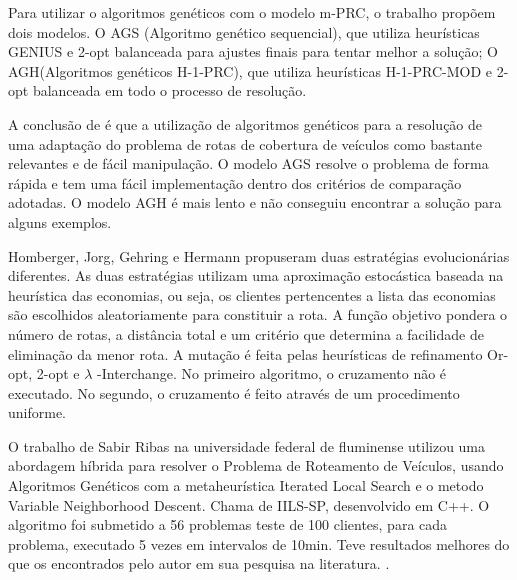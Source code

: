 \begin{minipage}{\linewidth}
    \label{fig:GrafoVUW}
\end{minipage}

Para utilizar o algoritmos genéticos com o modelo m-PRC, o trabalho propõem dois modelos. O AGS (Algoritmo genético sequencial), que utiliza heurísticas GENIUS e 2-opt balanceada para ajustes finais para tentar melhor a solução; O AGH(Algoritmos genéticos H-1-PRC), que utiliza heurísticas H-1-PRC-MOD e 2-opt balanceada em todo o processo de resolução.

A conclusão de \cite{Washington} é que a utilização de algoritmos genéticos para a resolução de uma adaptação do problema de rotas de cobertura de veículos como bastante relevantes e de fácil manipulação. O modelo AGS resolve o problema de forma rápida e tem uma fácil implementação dentro dos critérios de comparação adotadas. O modelo AGH é mais lento e não conseguiu encontrar a solução para alguns exemplos.

Homberger, Jorg, Gehring e Hermann propuseram duas estratégias evolucionárias diferentes. As duas estratégias utilizam uma aproximação estocástica baseada na heurística das economias, ou seja, os clientes pertencentes a lista das economias são escolhidos aleatoriamente para constituir a rota. A função objetivo pondera o número de rotas, a distância total e um critério que determina a facilidade de eliminação da menor rota. 
A mutação é feita pelas heurísticas de refinamento Or-opt, 2-opt\* e $\lambda$ -Interchange. No primeiro algoritmo, o cruzamento não é executado. No segundo, o cruzamento é feito através de um procedimento uniforme. \cite{HOMBERGER}

O trabalho de Sabir Ribas na universidade federal de fluminense utilizou uma abordagem híbrida para resolver o Problema de Roteamento de Veículos, usando Algoritmos Genéticos com a metaheurística Iterated Local Search e o metodo Variable Neighborhood Descent. Chama de IILS-SP, desenvolvido em C++. O algoritmo foi submetido a 56 problemas teste de 100 clientes, para cada problema, executado 5 vezes em intervalos de 10min. Teve resultados melhores do que os encontrados pelo autor em sua pesquisa na literatura. \cite{SABIRRIBAS}.

